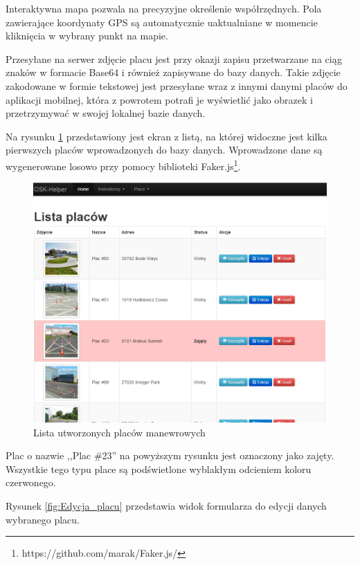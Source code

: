 \documentclass[twoside,a4paper,openright,12pt]{book}
\begin{document}
Interaktywna mapa pozwala na precyzyjne określenie współrzędnych. Pola zawierające koordynaty GPS są automatycznie uaktualniane w momencie kliknięcia w wybrany punkt na mapie.

Przesyłane na serwer zdjęcie placu jest przy okazji zapisu przetwarzane na ciąg znaków w formacie Base64  i również zapisywane do bazy danych.
Takie zdjęcie zakodowane w formie tekstowej jest przesyłane wraz z innymi danymi placów do aplikacji mobilnej, która z powrotem potrafi je wyświetlić jako obrazek i przetrzymywać w swojej lokalnej bazie danych.\newline \newline


Na rysunku \ref{fig:Lista_placow} przedstawiony jest ekran z listą, na której widoczne jest kilka pierwszych placów wprowadzonych do bazy danych. Wprowadzone dane są wygenerowane losowo przy pomocy biblioteki Faker.js\footnote{https://github.com/marak/Faker.js/}.

\begin{figure}[H]
\centering
\includegraphics[width=1\textwidth]{screenshots/panel/lista_placow.png}
\caption{Lista utworzonych placów manewrowych}
\label{fig:Lista_placow}
\end{figure}

Plac o nazwie ,,Plac \#23'' na powyższym rysunku jest oznaczony jako zajęty. Wszystkie tego typu place są podświetlone wyblakłym odcieniem koloru czerwonego.

\newpage
Rysunek \ref{fig:Edycja_placu} przedstawia widok formularza do edycji danych wybranego placu.
\end{document}

